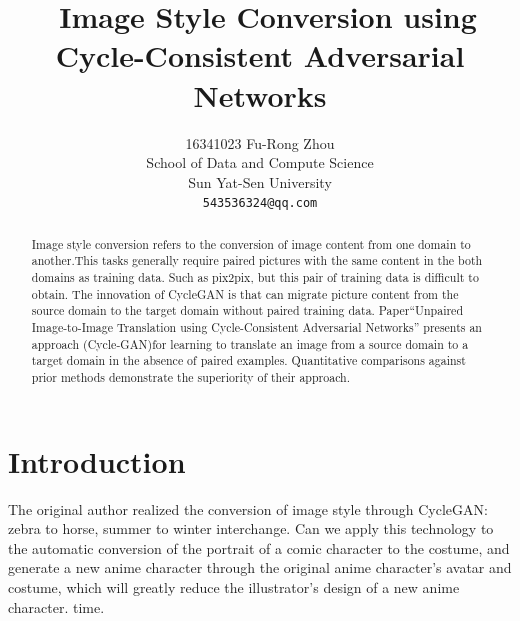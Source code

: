\documentclass[10pt,twocolumn,letterpaper]{article}
\begin{document}
\title{\LaTex\ Image Style Conversion using Cycle-Consistent Adversarial Networks}

\author{16341023 Fu-Rong Zhou\\
School of Data and Compute Science\\
Sun Yat-Sen University \\
{\tt\small 543536324@qq.com}
}
%

\maketitle

\begin{abstract}

   Image style conversion refers to the conversion of image content 
   from one domain to another.This tasks generally require paired 
   pictures with the same content in the both domains as training data.
   Such as pix2pix\cite{pix2pix}, but this pair of training data is difficult to obtain.
   The innovation of CycleGAN is that can migrate picture content from
   the source domain to the target domain without paired training data.
   Paper“Unpaired Image-to-Image Translation using Cycle-Consistent Adversarial Networks”\cite{CycleGAN}
   presents an approach (Cycle-GAN)for learning to translate an image from a source
   domain to a target domain in the absence of paired examples. Quantitative comparisons 
   against prior methods demonstrate the superiority of their approach.
   
\end{abstract}

\section{Introduction}

   The original author realized the conversion of image style through CycleGAN: 
   zebra to horse, summer to winter interchange. Can we apply this technology 
   to the automatic conversion of the portrait of a comic character to the costume, 
   and generate a new anime character through the original anime character's avatar and costume, 
   which will greatly reduce the illustrator's design of a new anime character. time.
   
\end{document}

